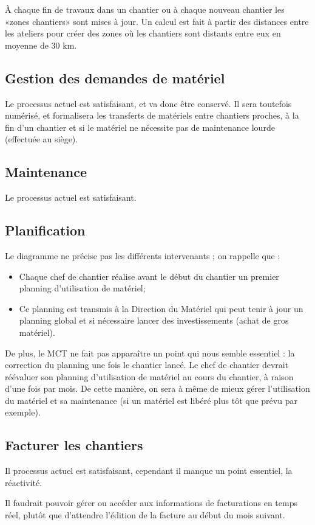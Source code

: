 À chaque fin de travaux dans un chantier ou à chaque nouveau chantier les
«zones chantiers» sont mises à jour. Un calcul est fait à partir des
distances entre les ateliers pour créer des zones où les chantiers sont
distants entre eux en moyenne de 30 km.


\subsection{Gestion des demandes de matériel}


Le processus actuel est satisfaisant, et va donc être conservé. Il sera
toutefois numérisé, et formalisera les transferts de matériels entre
chantiers proches, à la fin d'un chantier et si le matériel ne nécessite
pas de maintenance lourde (effectuée au siège).


\subsection{Maintenance}

Le processus actuel est satisfaisant.

\subsection{Planification}

Le diagramme ne précise pas les différents intervenants ; on rappelle que :
\begin{itemize}
\item Chaque chef de chantier réalise avant le début du chantier un premier
planning d'utilisation de matériel;
\item Ce planning est transmis à la Direction du Matériel qui peut tenir à
jour un planning global et si nécessaire lancer des investissements (achat
de gros matériel).
\end{itemize}

\vskip 6pt

De plus, le MCT ne fait pas apparaître un point qui nous semble essentiel :
la correction du planning une fois le chantier lancé. Le chef de chantier
devrait réévaluer son planning d'utilisation de matériel au cours du
chantier, à raison d'une fois par mois. De cette manière, on sera à même de
mieux gérer l'utilisation du matériel et sa maintenance (si un matériel est
libéré plus tôt que prévu par exemple).


\subsection{Facturer les chantiers}

Il processus actuel est satisfaisant, cependant il manque un point essentiel,
la réactivité.

Il faudrait pouvoir gérer ou accéder aux informations de facturations en 
temps réel, plutôt que d’attendre l'édition de la facture au début du 
mois suivant.


